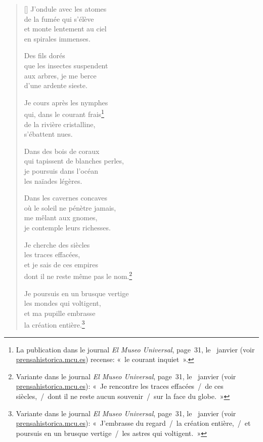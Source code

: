 \documentclass[a4paper,12pt]{book}
\begin{document}
\begin{verse}[\versewidth]
  J'ondule avec les atomes \\
  de la fumée qui s'élève \\
  et monte lentement au ciel \\
  en spirales immenses.

  Des fils dorés \\
  que les insectes suspendent \\
  aux arbres, je me berce \\
  d'une ardente sieste.

  Je cours après les nymphes \\
  qui, dans le courant frais\footnote{La publication dans
le journal \emph{El Museo Universal}, page~31, le~ janvier 
(voir \url{prensahistorica.mcu.es}) recense: «~le courant inquiet~».} \\
  de la rivière cristalline, \\
  s'ébattent nues.

  Dans des bois de coraux \\
  qui tapissent de blanches perles, \\
  je poursuis dans l'océan \\
  les naïades légères.

  Dans les cavernes concaves \\
  où le soleil ne pénètre jamais, \\
  me mêlant aux gnomes, \\
  je contemple leurs richesses.

  Je cherche des siècles \\
  les traces effacées, \\
  et je sais de ces empires \\
  dont il ne reste même pas le nom.\footnote{Variante dans le journal
  \emph{El Museo Universal}, page~31, le~ janvier  (voir
  \url{prensahistorica.mcu.es}): «~Je rencontre les traces effacées~/~de ces siècles,~/~dont il ne reste aucun souvenir~/~sur la face du globe.~»}

  Je poursuis en un brusque vertige \\
  les mondes qui voltigent, \\
  et ma pupille embrasse \\
  la création entière.\footnote{Variante dans le journal
  \emph{El Museo Universal}, page~31, le~ janvier  (voir
  \url{prensahistorica.mcu.es}): «~J'embrasse du regard~/~la création
  entière,~/~et poursuis en un brusque vertige~/~les astres qui voltigent.~»}


\end{verse}
\end{document}
